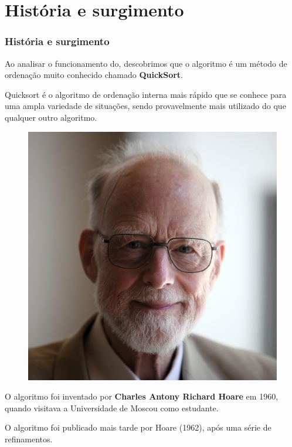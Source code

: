 \documentclass[
	11pt, %
]{beamer}
\begin{document}
\section{História e surgimento}
\begin{frame}
	\frametitle{História e surgimento}
	
	\footnotesize
	\justifying Ao analisar o funcionamento do, descobrimos que o algoritmo é um método de ordenação muito conhecido chamado \textbf{QuickSort}.
	
	\bigskip
	
	\justifying Quicksort é o algoritmo de ordenação interna mais rápido que se conhece para uma ampla variedade de situações, sendo provavelmente mais utilizado do que qualquer outro algoritmo.
	
	\bigskip
	\begin{figure}
		\includegraphics[width=1\linewidth]{Sir_Tony_Hoare_IMG_5125.jpg}
	\end{figure}

	O algoritmo foi inventado por \textbf{Charles Antony Richard Hoare} em 1960, quando visitava a Universidade de Moscou como estudante.
	
	\bigskip
	O algoritmo foi publicado mais tarde por Hoare (1962), após uma série de refinamentos.
	

\end{frame}
\end{document}
